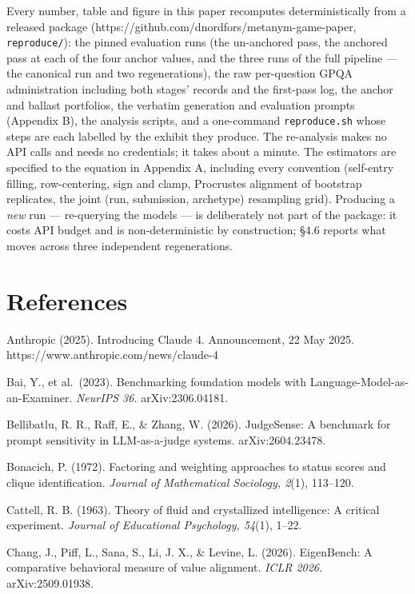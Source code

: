 \documentclass{article}
\begin{document}
Every number, table and figure in this paper recomputes deterministically from a released package (https://github.com/dnordfors/metanym-game-paper, \texttt{reproduce/}): the pinned evaluation runs (the un-anchored pass, the anchored pass at each of the four anchor values, and the three runs of the full pipeline --- the canonical run and two regenerations), the raw per-question GPQA administration including both stages' records and the first-pass log, the anchor and ballast portfolios, the verbatim generation and evaluation prompts (Appendix B), the analysis scripts, and a one-command \texttt{reproduce.sh} whose steps are each labelled by the exhibit they produce. The re-analysis makes no API calls and needs no credentials; it takes about a minute. The estimators are specified to the equation in Appendix A, including every convention (self-entry filling, row-centering, sign and clamp, Procrustes alignment of bootstrap replicates, the joint (run, submission, archetype) resampling grid). Producing a \emph{new} run --- re-querying the models --- is deliberately not part of the package: it costs API budget and is non-deterministic by construction; \S{}4.6 reports what moves across three independent regenerations.

\section*{References}
\begingroup\small\setlength{\parindent}{-1.5em}\setlength{\leftskip}{1.5em}

Anthropic (2025). Introducing Claude 4. Announcement, 22 May 2025. https://www.anthropic.com/news/claude-4

Bai, Y., et al.~(2023). Benchmarking foundation models with Language-Model-as-an-Examiner. \emph{NeurIPS 36.} arXiv:2306.04181.

Bellibatlu, R. R., Raff, E., \& Zhang, W. (2026). JudgeSense: A benchmark for prompt sensitivity in LLM-as-a-judge systems. arXiv:2604.23478.

Bonacich, P. (1972). Factoring and weighting approaches to status scores and clique identification. \emph{Journal of Mathematical Sociology, 2}(1), 113--120.

Cattell, R. B. (1963). Theory of fluid and crystallized intelligence: A critical experiment. \emph{Journal of Educational Psychology, 54}(1), 1--22.

Chang, J., Piff, L., Sana, S., Li, J. X., \& Levine, L. (2026). EigenBench: A comparative behavioral measure of value alignment. \emph{ICLR 2026.} arXiv:2509.01938.
\end{document}
